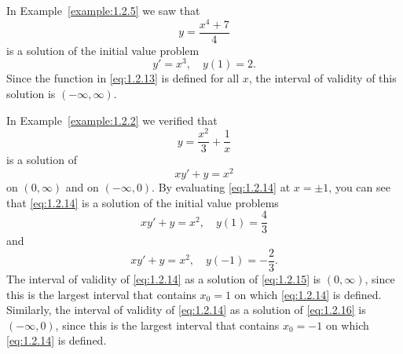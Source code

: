 \setcounter{example}{5}
\setcounter{equation}{12}
\begin{example}
  \label{example:1.2.6} \rm In Example~\ref{example:1.2.5} we saw that
  \begin{equation}
    \label{eq:1.2.13}y=\frac{x^{4}+7}{4}
  \end{equation}
  is a solution of the initial value problem
  \[
    y'=x^{3},\quad y(1)=2.
  \]
  Since the function in \eqref{eq:1.2.13} is defined for all $x$, the interval of validity of this
  solution is $(-\infty,\infty)$.
\end{example}

\setcounter{example}{6}
\setcounter{equation}{13}
\begin{example}
  \label{example:1.2.7} \rm In Example~\ref{example:1.2.2} we verified that
  \begin{equation}
    \label{eq:1.2.14}y=\frac{x^{2}}{3}+\frac{1}{x}
  \end{equation}
  is a solution of
  \[
    xy'+y=x^{2}
  \]
  on $(0,\infty)$ and on $(-\infty,0)$. By evaluating \eqref{eq:1.2.14} at $x=\pm1$, you can see
  that \eqref{eq:1.2.14} is a solution of the initial value problems
  \begin{equation}
    \label{eq:1.2.15}xy'+y=x^{2},\quad y(1)=\frac{4}{3}
  \end{equation}
  and
  \begin{equation}
    \label{eq:1.2.16}xy'+y=x^{2},\quad y(-1)=-\frac{2}{3}.
  \end{equation}
  The interval of validity of \eqref{eq:1.2.14} as a solution of \eqref{eq:1.2.15} is $(0,\infty)$,
  since this is the largest interval that contains $x_{0}=1$ on which \eqref{eq:1.2.14} is defined.
  Similarly, the interval of validity of \eqref{eq:1.2.14} as a solution of \eqref{eq:1.2.16} is
  $(-\infty,0)$, since this is the largest interval that contains $x_{0}=-1$ on which
  \eqref{eq:1.2.14} is defined.
\end{example}

